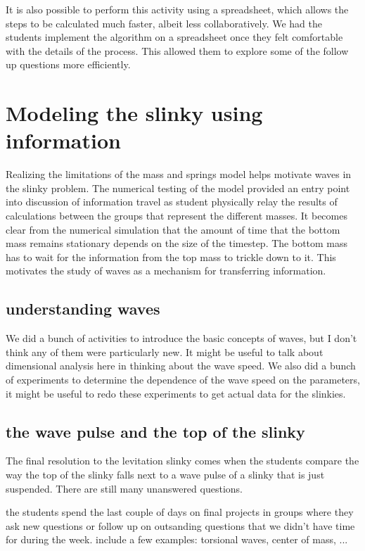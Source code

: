 \documentclass[aps,pre,10pt,superscriptaddress,showpacs,amsmath,amssymb,nofootinbib]{revtex4-1}
\begin{document}
It is also possible to perform this activity using a spreadsheet, which allows the steps to be
calculated much faster, albeit less collaboratively. We had the students implement the algorithm on a spreadsheet once they
felt comfortable with the details of the process. This allowed them to explore some of the follow
up questions more efficiently.

\section{Modeling the slinky using information}
\label{sec:information}

Realizing the limitations of the  mass and springs model helps motivate waves in
the slinky problem.  The numerical testing of the model provided an entry point
into discussion of information travel as student  physically relay the results
of calculations between the groups that represent the different masses.  It
becomes clear from the numerical simulation that the amount of time that the
bottom mass remains stationary depends on the size of the timestep.  The bottom
mass has to wait for the information from the top mass to trickle down to it. 
This motivates the study of waves as a mechanism for transferring information.

\subsection{understanding waves}
 We did a bunch of activities to introduce the basic concepts of waves, but I
 don't think any of them were particularly new.  It might be useful to talk about
dimensional analysis here in thinking about the wave speed.  We also did
a bunch of experiments to determine the dependence of the wave speed on
the parameters, it might be useful to redo these experiments to get actual data
for the slinkies.

\subsection{the wave pulse and the top of the slinky }
The final resolution to the levitation slinky comes when the students compare
the way the top of the slinky falls next to a wave pulse of a slinky that is
just suspended.  There are still many unanswered questions.

the students spend the last couple of days on final projects in groups where
they ask new questions or follow up on outsanding questions that we didn't have
time for during the week. include a few examples: torsional waves, center of 
mass, ...
\end{document}
